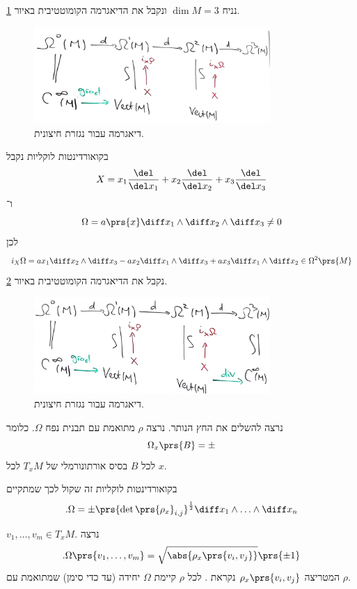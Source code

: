 \documentclass[a4paper,10pt,twoside,openany]{book}
\begin{document}
\begin{example}
נניח
$\dim M = 3$
ונקבל את הדיאגרמה הקומוטטיבית באיור
\ref{rot1}.

\begin{figure}[h!t]
\centering
\caption{דיאגרמה עבור נגזרת חיצונית.}
\label{rot1}
\includegraphics[width=0.8\textwidth]{sources/rot1}
\end{figure}

בקואורדינטות לוקליות נקבל
\[X = x_1 \frac{\del}{\del x_1} + x_2 \frac{\del}{\del x_2} + x_3 \frac{\del}{\del x_3}\]
ו־%
\[\Omega = a\prs{x} \diff x_1 \wedge \diff x_2 \wedge \diff x_3 \neq 0\]
לכן
\begin{align*}
i_X \Omega = a x_1 \diff x_2 \wedge \diff x_3 - ax_2 \diff x_1 \wedge \diff x_3 + a x_3 \diff x_1 \wedge \diff x_2 \in \Omega^2\prs{M}
\end{align*}
נקבל את הדיאגרמה הקומוטטיבית באיור
\ref{rot2}.
\begin{figure}[h!t]
\centering
\caption{דיאגרמה עבור נגזרת חיצונית.}
\label{rot2}
\includegraphics[width=0.8\textwidth]{sources/rot2}
\end{figure}
נרצה להשלים את החץ הנותר.
נרצה
$\rho$
מתואמת עם תבנית נפח
$\Omega$.
כלומר
\[\Omega_x\prs{B} = \pm\]
לכל
$B$
בסיס אורתונורמלי של
$T_x M$
לכל
$x$.

בקואורדינטות לוקליות זה שקול לכך שמתקיים
\[\text{.}\Omega = \pm \prs{\det \prs{\rho_x}_{i,j}}^{\frac{1}{2}} \diff x_1 \wedge \ldots \wedge \diff x_n\]

\begin{exercise}
$v_1, \ldots, v_m \in T_x M$.
נרצה
\begin{align*}
\text{.}\Omega \prs{v_1, \ldots, v_m} = \sqrt{\abs{\rho_x\prs{v_i, v_j}}}\prs{\pm 1}
\end{align*}
המטריצה
$\rho_x\prs{v_i, v_j}$
נקראת
.
לכל
$\rho$
קיימת
$\Omega$
יחידה (עד כדי סימן) שמתואמת עם
$\rho$.
\end{exercise}


\end{example}
\end{document}
